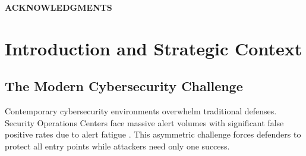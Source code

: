 \documentclass[12pt,oneside]{article}
\begin{document}
\clearpage
\begin{center}
\large\textbf{ACKNOWLEDGMENTS}
\end{center}

\clearpage

\listoffigures
\clearpage

\listoftables
\clearpage

\setcounter{page}{1}
\pagestyle{fancy}
\fancyhf{}
\fancyfoot[C]{\thepage}
\clearpage
\section{Introduction and Strategic Context}

\subsection{The Modern Cybersecurity Challenge}

Contemporary cybersecurity environments overwhelm traditional defenses. Security Operations Centers face massive alert volumes with significant false positive rates due to alert fatigue \cite{sommer2010outside}. This asymmetric challenge forces defenders to protect all entry points while attackers need only one success.
\end{document}

